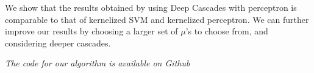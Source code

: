 \documentclass[paper=letter, fontsize=11pt]{scrartcl}
\numberwithin{equation}{section}		%
\numberwithin{figure}{section}			%
\numberwithin{table}{section}				%
\begin{document}
We show that the results obtained by using Deep Cascades with perceptron is comparable to that of kernelized SVM and kernelized perceptron. We can further improve our results by choosing a larger set of $\mu$'s to choose from, and considering deeper cascades.


\emph{\footnotesize The code for our algorithm is available on Github \cite{code}}


\nocite{fml}
\nocite{code}
\printbibliography
\end{document}
